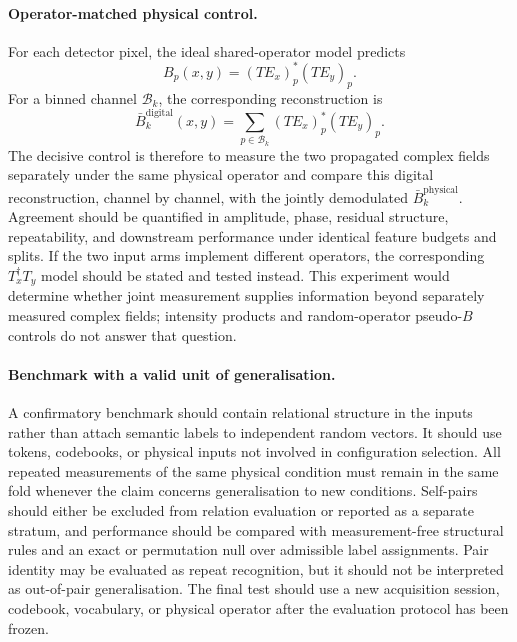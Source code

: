 \documentclass[11pt,a4paper]{article}
\begin{document}
\paragraph{Operator-matched physical control.}
For each detector pixel, the ideal shared-operator model predicts
\begin{equation}
 B_p(x,y)=(TE_x)_p^{*}(TE_y)_p .
\end{equation}
For a binned channel $\mathcal{B}_k$, the corresponding reconstruction is
\begin{equation}
 \bar B_k^{\mathrm{digital}}(x,y)
 =
 \sum_{p\in\mathcal{B}_k}
 (TE_x)_p^{*}(TE_y)_p .
\end{equation}
The decisive control is therefore to measure the two propagated complex
fields separately under the same physical operator and compare this digital
reconstruction, channel by channel, with the jointly demodulated
$\bar B_k^{\mathrm{physical}}$. Agreement should be quantified in amplitude,
phase, residual structure, repeatability, and downstream performance under
identical feature budgets and splits. If the two input arms implement
different operators, the corresponding $T_x^{\dagger}T_y$ model should be
stated and tested instead. This experiment would determine whether joint
measurement supplies information beyond separately measured complex fields;
intensity products and random-operator pseudo-$B$ controls do not answer that
question.

\paragraph{Benchmark with a valid unit of generalisation.}
A confirmatory benchmark should contain relational structure in the inputs
rather than attach semantic labels to independent random vectors. It should
use tokens, codebooks, or physical inputs not involved in configuration
selection. All repeated measurements of the same physical condition must
remain in the same fold whenever the claim concerns generalisation to new
conditions. Self-pairs should either be excluded from relation evaluation or
reported as a separate stratum, and performance should be compared with
measurement-free structural rules and an exact or permutation null over
admissible label assignments. Pair identity may be evaluated as repeat
recognition, but it should not be interpreted as out-of-pair generalisation.
The final test should use a new acquisition session, codebook, vocabulary, or
physical operator after the evaluation protocol has been frozen.
\end{document}
